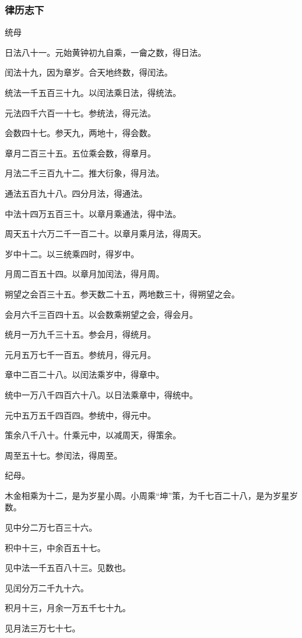 \documentclass[]{article}
\begin{document}
\hypertarget{header-n1234}{%
\subsubsection{律历志下}\label{header-n1234}}

统母

日法八十一。元始黄钟初九自乘，一龠之数，得日法。

闰法十九，因为章岁。合天地终数，得闰法。

统法一千五百三十九。以闰法乘日法，得统法。

元法四千六百一十七。参统法，得元法。

会数四十七。参天九，两地十，得会数。

章月二百三十五。五位乘会数，得章月。

月法二千三百九十二。推大衍象，得月法。

通法五百九十八。四分月法，得通法。

中法十四万五百三十。以章月乘通法，得中法。

周天五十六万二千一百二十。以章月乘月法，得周天。

岁中十二。以三统乘四时，得岁中。

月周二百五十四。以章月加闰法，得月周。

朔望之会百三十五。参天数二十五，两地数三十，得朔望之会。

会月六千三百四十五。以会数乘朔望之会，得会月。

统月一万九千三十五。参会月，得统月。

元月五万七千一百五。参统月，得元月。

章中二百二十八。以闰法乘岁中，得章中。

统中一万八千四百六十八。以日法乘章中，得统中。

元中五万五千四百四。参统中，得元中。

策余八千八十。什乘元中，以减周天，得策余。

周至五十七。参闰法，得周至。

纪母。

木金相乘为十二，是为岁星小周。小周乘``坤''策，为千七百二十八，是为岁星岁数。

见中分二万七百三十六。

积中十三，中余百五十七。

见中法一千五百八十三。见数也。

见闰分万二千九十六。

积月十三，月余一万五千七十九。

见月法三万七十七。
\end{document}

